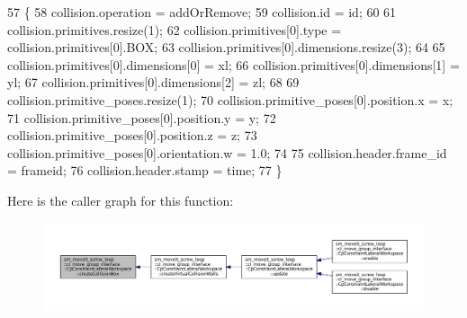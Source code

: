\begin{DoxyCode}
57         \{
58             collision.operation = addOrRemove;
59             collision.id = id;
60 
61             collision.primitives.resize(1);
62             collision.primitives[0].type = collision.primitives[0].BOX;
63             collision.primitives[0].dimensions.resize(3);
64 
65             collision.primitives[0].dimensions[0] = xl;
66             collision.primitives[0].dimensions[1] = yl;
67             collision.primitives[0].dimensions[2] = zl;
68 
69             collision.primitive\_poses.resize(1);
70             collision.primitive\_poses[0].position.x = x;
71             collision.primitive\_poses[0].position.y = y;
72             collision.primitive\_poses[0].position.z = z;
73             collision.primitive\_poses[0].orientation.w = 1.0;
74 
75             collision.header.frame\_id = frameid;
76             collision.header.stamp = time;
77         \}
\end{DoxyCode}
Here is the caller graph for this function\+:
\nopagebreak
\begin{figure}[H]
\begin{center}
\leavevmode
\includegraphics[width=350pt]{classsm__moveit__screw__loop_1_1cl__move__group__interface_1_1CpConstraintLateralWorkspace_acd85865e3dab3df429cee9fedf7c9f3c_icgraph}
\end{center}
\end{figure}
\mbox{\label{classsm__moveit__screw__loop_1_1cl__move__group__interface_1_1CpConstraintLateralWorkspace_a0eab8923125db7d219b12ca0716f3fe4}} 
